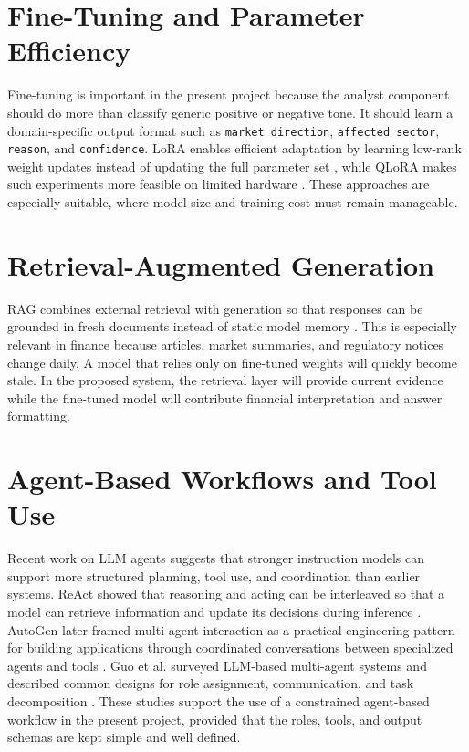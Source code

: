 \documentclass[12pt,a4paper]{report}
\begin{document}
\section{Fine-Tuning and Parameter Efficiency}
Fine-tuning is important in the present project because the analyst component should do more than classify generic positive or negative tone. It should learn a domain-specific output format such as \texttt{market direction}, \texttt{affected sector}, \texttt{reason}, and \texttt{confidence}. LoRA enables efficient adaptation by learning low-rank weight updates instead of updating the full parameter set \cite{hu2021lora}, while \ac{QLoRA} makes such experiments more feasible on limited hardware \cite{dettmers2023qlora}. These approaches are especially suitable, where model size and training cost must remain manageable.

\section{Retrieval-Augmented Generation}
\ac{RAG} combines external retrieval with generation so that responses can be grounded in fresh documents instead of static model memory \cite{lewis2020rag}. This is especially relevant in finance because articles, market summaries, and regulatory notices change daily. A model that relies only on fine-tuned weights will quickly become stale. In the proposed system, the retrieval layer will provide current evidence while the fine-tuned model will contribute financial interpretation and answer formatting.

\section{Agent-Based Workflows and Tool Use}
Recent work on LLM agents suggests that stronger instruction models can support more structured planning, tool use, and coordination than earlier systems. ReAct showed that reasoning and acting can be interleaved so that a model can retrieve information and update its decisions during inference \cite{yao2023react}. AutoGen later framed multi-agent interaction as a practical engineering pattern for building applications through coordinated conversations between specialized agents and tools \cite{wu2023autogen}. Guo et al. surveyed LLM-based multi-agent systems and described common designs for role assignment, communication, and task decomposition \cite{guo2024multiagentsurvey}. These studies support the use of a constrained agent-based workflow in the present project, provided that the roles, tools, and output schemas are kept simple and well defined.
\end{document}
